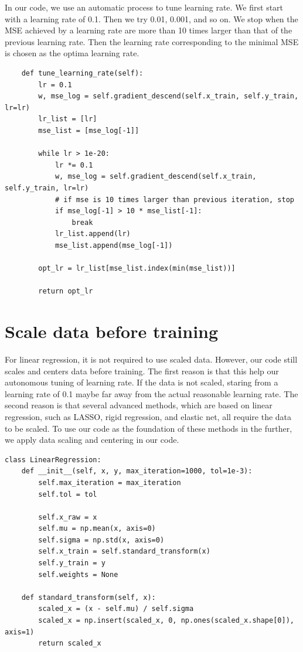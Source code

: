 \documentclass[
	letterpaper
]{article}
\begin{document}
In our code, we use an automatic process to tune learning rate. 
We first start with a learning rate of 0.1.
Then we try 0.01, 0.001, and so on.
We stop when the MSE achieved by a learning rate are more than 10 times larger than that of the previous learning rate.
Then the learning rate corresponding to the minimal MSE is chosen as the optima learning rate.
\begin{lstlisting}
    def tune_learning_rate(self):
        lr = 0.1
        w, mse_log = self.gradient_descend(self.x_train, self.y_train, lr=lr)
        lr_list = [lr]
        mse_list = [mse_log[-1]]

        while lr > 1e-20:
            lr *= 0.1
            w, mse_log = self.gradient_descend(self.x_train, self.y_train, lr=lr)
            # if mse is 10 times larger than previous iteration, stop
            if mse_log[-1] > 10 * mse_list[-1]:
                break
            lr_list.append(lr)
            mse_list.append(mse_log[-1])

        opt_lr = lr_list[mse_list.index(min(mse_list))]

        return opt_lr
\end{lstlisting}

\section{Scale data before training}
For linear regression, it is not required to use scaled data.
However, our code still scales and centers data before training.
The first reason is that this help our autonomous tuning of learning rate.
If the data is not scaled, staring from a learning rate of 0.1 maybe far away from the actual reasonable learning rate.
The second reason is that several advanced methods, which are based on linear regression, such as LASSO, rigid regression, and elastic net, all require the data to be scaled.
To use our code as the foundation of these methods in the further, we apply data scaling and centering in our code.
\begin{lstlisting}
class LinearRegression:
    def __init__(self, x, y, max_iteration=1000, tol=1e-3):
        self.max_iteration = max_iteration
        self.tol = tol
        
        self.x_raw = x
        self.mu = np.mean(x, axis=0)
        self.sigma = np.std(x, axis=0)
        self.x_train = self.standard_transform(x)
        self.y_train = y
        self.weights = None
        
    def standard_transform(self, x):
        scaled_x = (x - self.mu) / self.sigma
        scaled_x = np.insert(scaled_x, 0, np.ones(scaled_x.shape[0]), axis=1)
        return scaled_x
\end{lstlisting}
\end{document}
